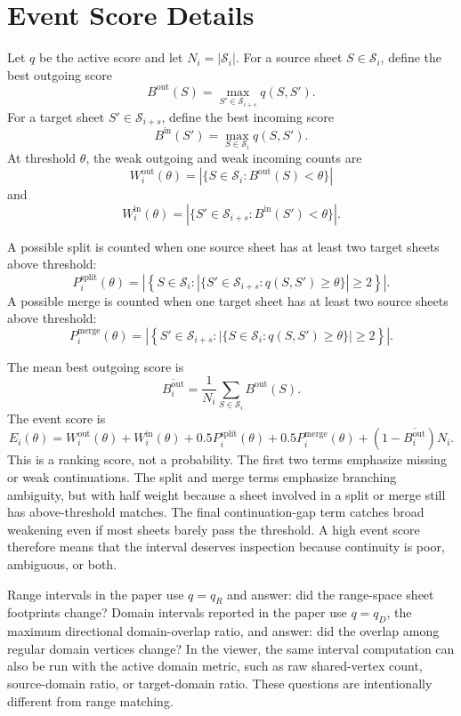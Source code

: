 \documentclass{vgtc}
\newcommand{\Sheets}{\mathcal{S}}
\newcommand{\Sheet}{S}
\begin{document}
\section{Event Score Details}

Let $q$ be the active score and let $N_i=|\Sheets_i|$. For a source sheet $\Sheet\in\Sheets_i$, define the best outgoing score
$$
B^\mathrm{out}(\Sheet)=\max_{\Sheet'\in\Sheets_{i+s}}q(\Sheet,\Sheet').
$$
For a target sheet $\Sheet'\in\Sheets_{i+s}$, define the best incoming score
$$
B^\mathrm{in}(\Sheet')=\max_{\Sheet\in\Sheets_i}q(\Sheet,\Sheet').
$$
At threshold $\theta$, the weak outgoing and weak incoming counts are
$$
W^\mathrm{out}_i(\theta)=
\left|\{\Sheet\in\Sheets_i:B^\mathrm{out}(\Sheet)<\theta\}\right|
$$
and
$$
W^\mathrm{in}_i(\theta)=
\left|\{\Sheet'\in\Sheets_{i+s}:B^\mathrm{in}(\Sheet')<\theta\}\right|.
$$

A possible split is counted when one source sheet has at least two target sheets above threshold:
$$
P^\mathrm{split}_i(\theta)=
\left|
\left\{
\Sheet\in\Sheets_i:
\left|\{\Sheet'\in\Sheets_{i+s}:q(\Sheet,\Sheet')\geq\theta\}\right|\geq2
\right\}
\right|.
$$
A possible merge is counted when one target sheet has at least two source sheets above threshold:
$$
P^\mathrm{merge}_i(\theta)=
\left|
\left\{
\Sheet'\in\Sheets_{i+s}:
\left|\{\Sheet\in\Sheets_i:q(\Sheet,\Sheet')\geq\theta\}\right|\geq2
\right\}
\right|.
$$

The mean best outgoing score is
$$
\overline{B^\mathrm{out}_i}=
\frac{1}{N_i}\sum_{\Sheet\in\Sheets_i}B^\mathrm{out}(\Sheet).
$$
The event score is
$$
E_i(\theta)=
W^\mathrm{out}_i(\theta)+W^\mathrm{in}_i(\theta)
+0.5P^\mathrm{split}_i(\theta)+0.5P^\mathrm{merge}_i(\theta)
+(1-\overline{B^\mathrm{out}_i})N_i.
$$
This is a ranking score, not a probability. The first two terms emphasize missing or weak continuations. The split and merge terms emphasize branching ambiguity, but with half weight because a sheet involved in a split or merge still has above-threshold matches. The final continuation-gap term catches broad weakening even if most sheets barely pass the threshold. A high event score therefore means that the interval deserves inspection because continuity is poor, ambiguous, or both.

Range intervals in the paper use $q=q_R$ and answer: did the range-space sheet footprints change? Domain intervals reported in the paper use $q=q_D$, the maximum directional domain-overlap ratio, and answer: did the overlap among regular domain vertices change? In the viewer, the same interval computation can also be run with the active domain metric, such as raw shared-vertex count, source-domain ratio, or target-domain ratio. These questions are intentionally different from range matching.
\end{document}
